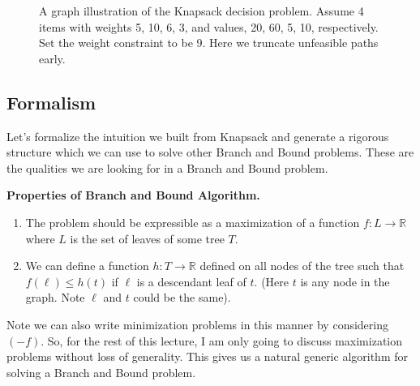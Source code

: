 \documentclass[10pt]{article}
\theoremstyle{plain}
\theoremstyle{definition}
\newcommand{\RR}{\mathbb{R}}
\numberwithin{equation}{section}
\numberwithin{figure}{section}
\begin{document}
\begin{figure}
{
}

\caption{A graph illustration of the Knapsack decision problem. Assume 4 items with weights 5, 10, 6, 3, and values, 20, 60, 5, 10, respectively. Set the weight constraint to be 9. Here we truncate unfeasible paths early.\label{cutknapsack}}
\end{figure}

\subsection{Formalism}
Let's formalize the intuition we built from Knapsack and generate a rigorous structure which we can use to solve other Branch and Bound problems. These are the qualities we are looking for in a Branch and Bound problem.

\begin{framed}
\noindent \textbf{Properties of Branch and Bound Algorithm.} \\
\begin{enumerate}
\item The problem should be expressible as a maximization of a function $f: L \rightarrow \RR$ where $L$ is the set of leaves of some tree $T$.
\item We can define a function $h: T \rightarrow \RR$ defined on all nodes of the tree such that $f(\ell) \leq h(t)$ if $\ell$ is a descendant leaf of $t$. (Here $t$ is any node in the graph. Note $\ell$ and $t$ could be the same).
\end{enumerate}
\end{framed}
\noindent Note we can also write minimization problems in this manner by considering $(-f)$. So, for the rest of this lecture, I am only going to discuss maximization problems without loss of generality. This gives us a natural generic algorithm for solving a Branch and Bound problem.
\end{document}

